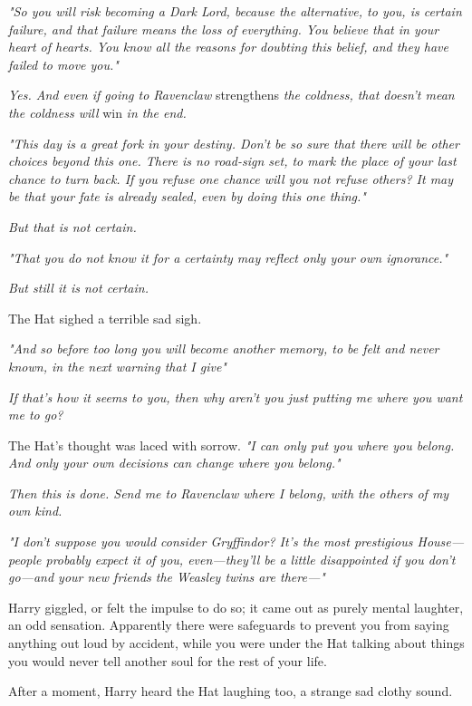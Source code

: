 \emph{"So you will risk becoming a Dark Lord, because the alternative, to you,
    is certain failure, and that failure means the loss of everything. You believe
    that in your heart of hearts. You know all the reasons for doubting this
    belief, and they have failed to move you."}

\emph{Yes. And even if going to Ravenclaw} strengthens \emph{the coldness, that
doesn't mean the coldness will} win \emph{in the end.}

\emph{"This day is a great fork in your destiny. Don't be so sure that there
will be other choices beyond this one. There is no road-sign set, to mark the
place of your last chance to turn back. If you refuse one chance will
you not refuse others? It may be that your fate is already sealed, even by
doing this one thing."}

\emph{But that is not certain.}

\emph{"That you do not know it for a certainty may reflect only
your own ignorance."}

\emph{But still it is not certain.}

The Hat sighed a terrible sad sigh.

\emph{"And so before too long you will become another memory, to be felt and
never known, in the next warning that I give{\el}"}

\emph{If that's how it seems to you, then why aren't you just putting me
where you want me to go?}

The Hat's thought was laced with sorrow. \emph{"I can only put you where you
belong. And only your own decisions can change where you belong."}

\emph{Then this is done. Send me to Ravenclaw where I belong, with the others
of my own kind.}

\emph{"I don't suppose you would consider Gryffindor? It's the most prestigious
House---people probably expect it of you, even---they'll be a little
disappointed if you don't go---and your new friends the Weasley twins are
there\mbox{---}"}

Harry giggled, or felt the impulse to do so; it came out as purely mental
laughter, an odd sensation. Apparently there were safeguards to prevent you
from saying anything out loud by accident, while you were under the Hat talking
about things you would never tell another soul for the rest of your life.

After a moment, Harry heard the Hat laughing too, a strange sad clothy sound.

